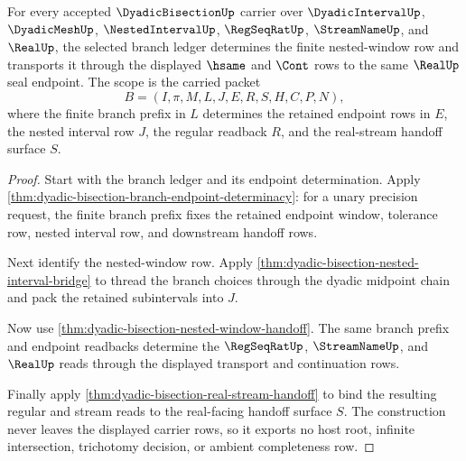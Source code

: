 \begin{theorem}
\label{thm:dyadic-bisection-branch-nested-window-scope}
For every accepted $\DyadicBisectionUp$ carrier over $\DyadicIntervalUp$, $\DyadicMeshUp$, $\NestedIntervalUp$, $\RegSeqRatUp$, $\StreamNameUp$, and $\RealUp$, the selected branch ledger determines the finite nested-window row and transports it through the displayed $\hsame$ and $\Cont$ rows to the same $\RealUp$ seal endpoint. The scope is the carried packet
$$
B=(I,\pi,M,L,J,E,R,S,H,C,P,N),
$$
where the finite branch prefix in $L$ determines the retained endpoint rows in $E$, the nested interval row $J$, the regular readback $R$, and the real-stream handoff surface $S$.
\end{theorem}
\begin{proof}
Start with the branch ledger and its endpoint determination. Apply \autoref{thm:dyadic-bisection-branch-endpoint-determinacy}: for a unary precision request, the finite branch prefix fixes the retained endpoint window, tolerance row, nested interval row, and downstream handoff rows.

Next identify the nested-window row. Apply \autoref{thm:dyadic-bisection-nested-interval-bridge} to thread the branch choices through the dyadic midpoint chain and pack the retained subintervals into $J$.

Now use \autoref{thm:dyadic-bisection-nested-window-handoff}. The same branch prefix and endpoint readbacks determine the $\RegSeqRatUp$, $\StreamNameUp$, and $\RealUp$ reads through the displayed transport and continuation rows.

Finally apply \autoref{thm:dyadic-bisection-real-stream-handoff} to bind the resulting regular and stream reads to the real-facing handoff surface $S$. The construction never leaves the displayed carrier rows, so it exports no host root, infinite intersection, trichotomy decision, or ambient completeness row.
\end{proof}

